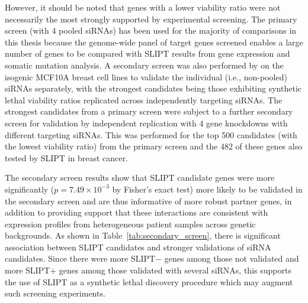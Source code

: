 However, it should be noted that genes with a lower viability ratio were not necessarily the most strongly supported by experimental screening. The primary screen (with 4 pooled \glspl{siRNA}) has been used for the majority of comparisons in this thesis because the genome-wide panel of target genes screened enables a large number of genes to be compared with \gls{SLIPT} results from gene expression and somatic mutation analysis. A secondary screen was also performed by \citet{Telford2015} on the isogenic MCF10A breast cell lines to validate the individual (i.e., non-pooled) \glspl{siRNA} separately, with the strongest candidates being those exhibiting synthetic lethal viability ratios replicated across independently targeting \glspl{siRNA}. The strongest candidates from a primary screen were subject to a further secondary screen for validation by independent replication with 4 gene knockdowns with different targeting \glspl{siRNA}. This was performed for the top 500 candidates (with the lowest viability ratio) from the primary screen and the 482 of these genes also tested by \gls{SLIPT} in breast cancer.%

The secondary screen results show that \gls{SLIPT} candidate genes were more significantly ($p=7.49 \times 10^{-3}$ by Fisher's exact test) more  likely to be validated in the secondary screen and are thus informative of more robust partner genes, in addition to providing support that these interactions are consistent with expression profiles from heterogeneous patient samples across genetic backgrounds. As shown in Table~\ref{tab:secondary_screen}, there is significant %
association between SLIPT candidates and stronger validations of siRNA candidates. Since there were more SLIPT$-$ genes among those not validated and more SLIPT$+$ genes among those validated with several siRNAs, this supports the use of SLIPT as a synthetic lethal discovery procedure which may augment such screening experiments.

